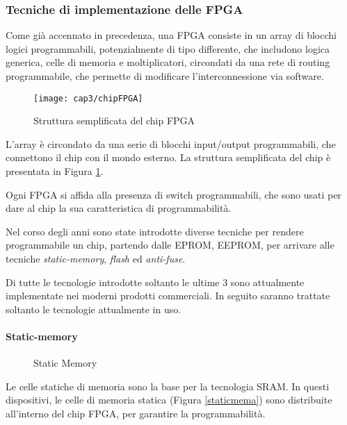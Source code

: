\subsubsection{Tecniche di implementazione delle FPGA}
Come già accennato in precedenza, una FPGA consiste in un array di blocchi logici programmabili, potenzialmente di tipo differente, che includono logica generica, celle di memoria e moltiplicatori, circondati da una rete di routing programmabile, che permette di modificare l'interconnessione via software.

\begin{figure}  
  \begin{center}
    \texttt{[image: cap3/chipFPGA]}
    \caption{Struttura semplificata del chip FPGA}
    \label{chipFPGA}
  \end{center}
\end{figure}
L'array è circondato da una serie di blocchi input/output programmabili, che connettono il chip con il mondo esterno. La struttura semplificata del chip è presentata in Figura \ref{chipFPGA}.

Ogni FPGA si affida alla presenza di switch programmabili, che sono usati per dare al chip la sua caratteristica di programmabilità.

Nel corso degli anni sono state introdotte diverse tecniche per rendere programmabile un chip, partendo dalle EPROM, EEPROM, per arrivare alle tecniche  \textit{static-memory}, \textit{flash} ed \textit{anti-fuse}.

Di tutte le tecnologie introdotte soltanto le ultime $3$ sono attualmente implementate nei moderni prodotti commerciali. In seguito saranno trattate soltanto le tecnologie attualmente in uso.

\paragraph{Static-memory}
\begin{figure}
\centering
{}
\hspace{5mm}
\hspace{5mm}
\caption{Static Memory}\label{staticmem}
\end{figure}
Le celle statiche di memoria sono la base per la tecnologia SRAM. In questi dispositivi, le celle di memoria statica (Figura \ref{staticmema}) sono distribuite all'interno del chip FPGA, per garantire la programmabilità.

